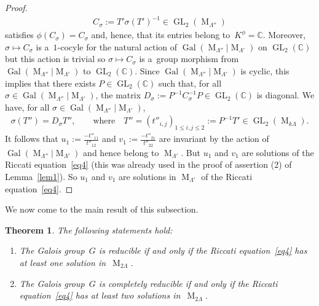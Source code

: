 \documentclass[11pt]{article}
\numberwithin{equation}{section}
\newtheorem{Theorem}{Theorem}[section]
\begin{document}
\begin{proof}
\begin{gather*}
C_{\sigma}:=T' \sigma (T' )^{-1} \in \operatorname{GL}_{2}(\operatorname{M}_{\Lambda''})
\end{gather*}
satisf\/ies $\phi (C_{\sigma}) = C_{\sigma}$ and, hence, that its entries belong to~$K^{\phi} = \mathbb C$.
Moreover, $\sigma \mapsto C_{\sigma}$ is a~$1$-cocyle for the natural action of
$\operatorname{Gal}(\operatorname{M}_{\Lambda''}|\operatorname{M}_{\Lambda'})$ on $\operatorname{GL}_{2}(\mathbb C)$
but this action is trivial so $\sigma \mapsto C_{\sigma}$ is a~group morphism
from~$\operatorname{Gal}(\operatorname{M}_{\Lambda''}|\operatorname{M}_{\Lambda'})$ to $\operatorname{GL}_{2}(\mathbb
C)$.
Since $\operatorname{Gal}(\operatorname{M}_{\Lambda''}|\operatorname{M}_{\Lambda'})$ is cyclic, this implies that there
exists $P\in \operatorname{GL}_{2}(\mathbb C)$ such that, for all $\sigma\in
\operatorname{Gal}(\operatorname{M}_{\Lambda''}|\operatorname{M}_{\Lambda'})$, the matrix
${D_{\sigma}:=P^{-1}C_{\sigma}^{-1}P} \in \operatorname{GL}_{2}(\mathbb C)$ is diagonal.
We have, for all $\sigma \in\operatorname{Gal}(\operatorname{M}_{\Lambda''}|\operatorname{M}_{\Lambda'})$,
\begin{gather*}
\sigma(T'')=D_{\sigma}T'',\qquad  \text{where} \quad T''=(t''_{i,j})_{1 \leq i,j \leq 2}:=P^{-1}T' \in
\operatorname{GL}_{2}(\operatorname{M}_{k \Lambda}).
\end{gather*}
It follows that $u_{1}:=\frac{-t''_{11}}{t''_{12}}$ and $v_{1}:=\frac{-t''_{21}}{t''_{22}}$ are invariant by the action
of $\operatorname{Gal}(\operatorname{M}_{\Lambda''}|\operatorname{M}_{\Lambda'})$ and hence belong to
$\operatorname{M}_{\Lambda'}$.
But $u_{1}$ and $v_{1}$ are solutions of the Riccati equation~\eqref{eq4} (this was already used in the proof of
assertion (2) of Lemma~\ref{lem1}).
So $u_{1}$ and $v_{1}$ are solutions in $\operatorname{M}_{\Lambda'}$ of the Riccati equation~\eqref{eq4}.
\end{proof}

We now come to the main result of this subsection.

\begin{Theorem}
\label{theo2}
The following statements hold:
\begin{enumerate}
\itemsep=0pt
\item[$1.$] The Galois group~$G$ is reducible if and only if the Riccati equation~\eqref{eq4} has at least one solution
in~$\operatorname{M}_{2\Lambda}$.
\item[$2.$] The Galois group~$G$ is completely reducible if and only if the Riccati equation~\eqref{eq4} has at least two
solutions in~$\operatorname{M}_{2\Lambda}$.
\end{enumerate}
\end{Theorem}
\end{document}
